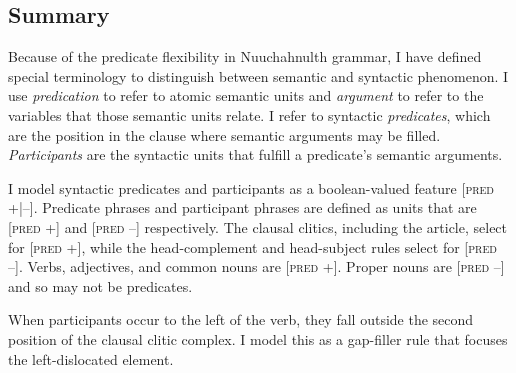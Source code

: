 \subsection{Summary}

Because of the predicate flexibility in Nuuchahnulth grammar, I have defined special terminology to distinguish between semantic and syntactic phenomenon. I use \textit{predication} to refer to atomic semantic units and \textit{argument} to refer to the variables that those semantic units relate. I refer to syntactic \textit{predicates}, which are the position in the clause where semantic arguments may be filled. \textit{Participants} are the syntactic units that fulfill a predicate's semantic arguments.

I model syntactic predicates and participants as a boolean-valued feature [\textsc{pred} +|--]. Predicate phrases and participant phrases are defined as units that are [\textsc{pred} +] and [\textsc{pred} --] respectively. The clausal clitics, including the article, select for [\textsc{pred} +], while the head-complement and head-subject rules select for [\textsc{pred} --]. Verbs, adjectives, and common nouns are [\textsc{pred} +]. Proper nouns are [\textsc{pred} --] and so may not be predicates.

When participants occur to the left of the verb, they fall outside the second position of the clausal clitic complex. I model this as a gap-filler rule that focuses the left-dislocated element.

